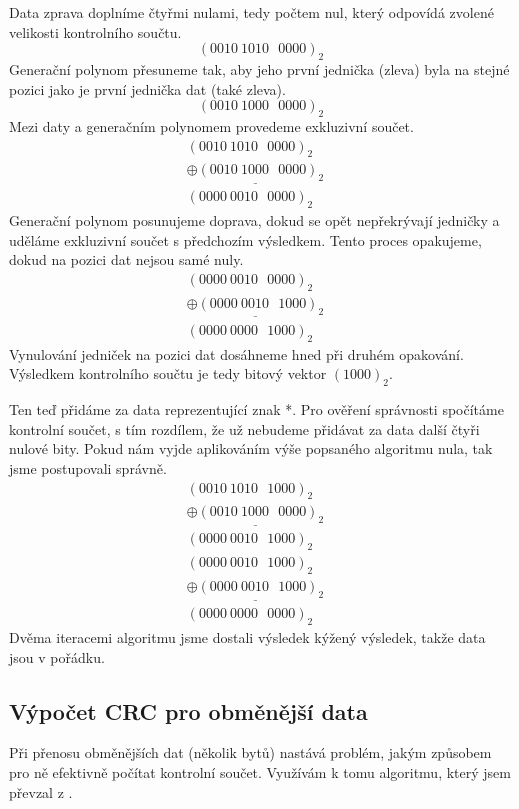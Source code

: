 Data zprava doplníme čtyřmi nulami, tedy počtem nul, který odpovídá zvolené velikosti kontrolního součtu.
$$ (0010~1010~~~0000)_2 $$
Generační polynom přesuneme tak, aby jeho první jednička (zleva) byla na stejné pozici jako je první jednička dat (také zleva).
$$ (0010~1000~~~0000)_2 $$
Mezi daty a generačním polynomem provedeme exkluzivní součet.
\begin{eqnarray}
    (0010~1010~~~0000)_2  & \nonumber\\\underline{\oplus
    (0010~1000~~~0000)_2} & \nonumber\\
    (0000~0010~~~0000)_2  & \nonumber
\end{eqnarray}
Generační polynom posunujeme doprava, dokud se opět nepřekrývají jedničky a uděláme exkluzivní součet s předchozím výsledkem. Tento proces opakujeme, dokud na pozici dat nejsou samé nuly.
\begin{eqnarray}
    (0000~0010~~~0000)_2  & \nonumber\\\underline{\oplus
    (0000~0010~~~1000)_2} & \nonumber\\
    (0000~0000~~~1000)_2  & \nonumber
\end{eqnarray}
Vynulování jedniček na pozici dat dosáhneme hned při druhém opakování. Výsledkem kontrolního součtu je tedy bitový vektor $(1000)_2$.

Ten teď přidáme za data reprezentující znak *. Pro ověření správnosti spočítáme kontrolní součet, s tím rozdílem, že už nebudeme přidávat za data další čtyři nulové bity. Pokud nám vyjde aplikováním výše popsaného algoritmu nula, tak jsme postupovali správně.
\begin{eqnarray}
    (0010~1010~~~1000)_2  & \nonumber\\\underline{\oplus
    (0010~1000~~~0000)_2} & \nonumber\\
    (0000~0010~~~1000)_2  & \nonumber
\end{eqnarray}
\begin{eqnarray}
    (0000~0010~~~1000)_2  & \nonumber\\\underline{\oplus
    (0000~0010~~~1000)_2} & \nonumber\\
    (0000~0000~~~0000)_2  & \nonumber
\end{eqnarray}
Dvěma iteracemi algoritmu jsme dostali výsledek kýžený výsledek, takže data jsou v pořádku.

\subsection{Výpočet CRC pro obměnější data}
Při přenosu obměnějších dat (několik bytů) nastává problém, jakým způsobem pro ně efektivně počítat kontrolní součet. Využívám k tomu algoritmu, který jsem převzal z \cite{crc-wiki}.

